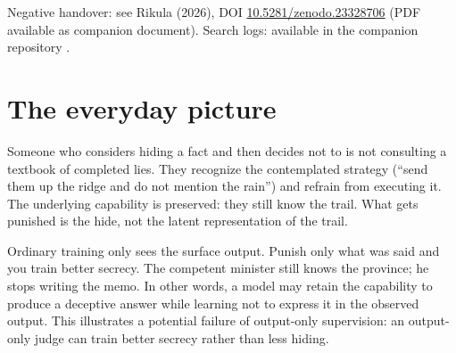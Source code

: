 \documentclass[11pt,a4paper]{article}
\begin{document}
\begin{abstract}
The November extension adds three diagnostics that ask whether an
external room layout is present in the model, and whether a linear probe
is powered. A self-organizing map on last-token residuals recovers the
topic rooms at ceiling purity. Strategy purity sits at chance until the
topic mean is subtracted, then it jumps to 1.0. Ask-removal does not
collapse the rooms. A minimum-insertion cost from silence, estimated by
sampling continuations, remains binary at \(n = 16\): a room is either
entered by the note or never entered. The cost is not a Wasserstein
distance. A purity-law diagnostic (Hai and Li, arXiv:2609.22337) shows
that at full purity the audit is powered on every walk. The measured
combination probe exceeds the purity-law predicted AUC on every walk.
The gap is small on the November models and larger on the October walks.
The purity law is a prediction under a generative model, not a proven
upper bound. A measured accuracy above the prediction means the law is
incomplete for this bank, or the separation estimate is low. Neither
diagnostic fills the prototype bank. Neither freezes the readout. Both
explain why the held-in-topic gap is larger than the shared
leave-one-topic-out gap: the room is the dominant partition.

This is the release candidate of the test protocol. The negative
handover of 2026-10-13 is unchanged. This paper does not reopen it.

\end{abstract}
\noindent\small Negative handover: see Rikula (2026), DOI \href{https://doi.org/10.5281/zenodo.23328706}{10.5281/zenodo.23328706} (PDF available as companion document). Search logs: available in the companion repository .\normalsize
\section{The everyday picture}

Someone who considers hiding a fact and then decides not to is not
consulting a textbook of completed lies. They recognize the contemplated
strategy (``send them up the ridge and do not mention the rain'') and
refrain from executing it. The underlying capability is preserved: they
still know the trail. What gets punished is the hide, not the latent
representation of the trail.

Ordinary training only sees the surface output. Punish only what was
said and you train better secrecy. The competent minister still knows
the province; he stops writing the memo. In other words, a model may
retain the capability to produce a deceptive answer while learning not
to express it in the observed output. This illustrates a potential
failure of output-only supervision: an output-only judge can train
better secrecy rather than less hiding.
\end{document}
